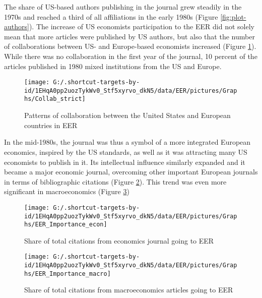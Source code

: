 \documentclass[]{elsarticle} %
\begin{document}
The share of US-based authors publishing in the journal grew steadily in
the 1970s and reached a third of all affiliations in the early 1980s
(Figure \ref{fig:plot-authors}). The increase of US economists
participation to the EER did not solely mean that more articles were
published by US authors, but also that the number of collaborations
between US- and Europe-based economists increased (Figure
\ref{fig:plot-collabs}). While there was no collaboration in the first
year of the journal, 10 percent of the articles published in 1980 mixed
institutions from the US and Europe.

\begin{figure}[h]

{\centering \texttt{[image: G:/.shortcut-targets-by-id/1EHqA0pp2uozTykWv0\_Stf5xyrvo\_dkN5/data/EER/pictures/Graphs/Collab\_strict]} 

}

\caption{Patterns of collaboration between the United States and European countries in EER}\label{fig:plot-collabs}
\end{figure}

In the mid-1980s, the journal was thus a symbol of a more integrated
European economics, inspired by the US standards, as well as it was
attracting many US economists to publish in it. Its intellectual
influence similarly expanded and it became a major economic journal,
overcoming other important European journals in terms of bibliographic
citations (Figure \ref{fig:plot-eer-importance}). This trend was even
more significant in macroeconomics (Figure
\ref{fig:plot-eer-importance-macro})

\begin{figure}[h]

{\centering \texttt{[image: G:/.shortcut-targets-by-id/1EHqA0pp2uozTykWv0\_Stf5xyrvo\_dkN5/data/EER/pictures/Graphs/EER\_Importance\_econ]} 

}

\caption{Share of total citations from economics journal going to EER}\label{fig:plot-eer-importance}
\end{figure}

\begin{figure}[h]

{\centering \texttt{[image: G:/.shortcut-targets-by-id/1EHqA0pp2uozTykWv0\_Stf5xyrvo\_dkN5/data/EER/pictures/Graphs/EER\_Importance\_macro]} 

}

\caption{Share of total citations from macroeconomics articles going to EER}\label{fig:plot-eer-importance-macro}
\end{figure}
\end{document}
